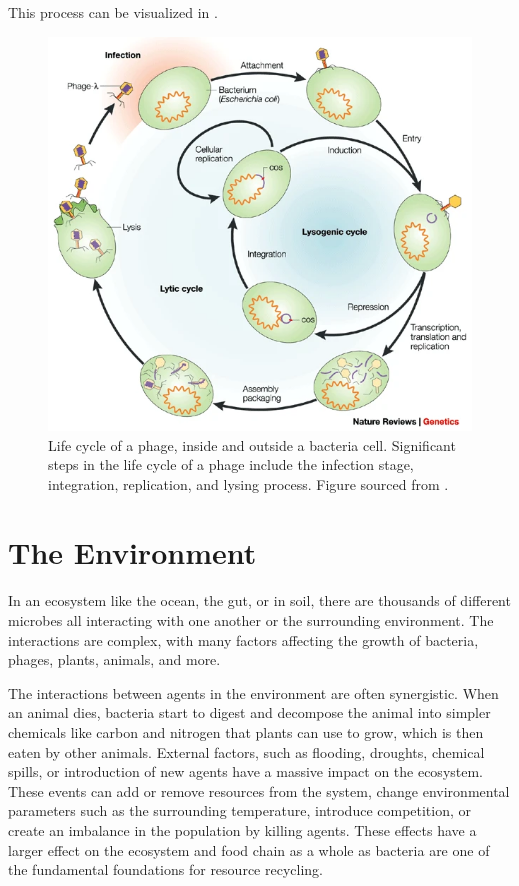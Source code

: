 This process can be visualized in .
\begin{figure}
    \centering
    \includegraphics[width=0.5\linewidth]{Figures/phage_life_cycle.png}
    \caption{Life cycle of a phage, inside and outside a bacteria cell. Significant steps in the life cycle of a phage include the infection stage, integration, replication, and lysing process. Figure sourced from \citet{campbellFutureBacteriophageBiology2003}. }
    \label{fig:phage_life_cycle}
\end{figure}

\section{The Environment}
In an ecosystem like the ocean, the gut, or in soil, there are thousands of different microbes all interacting with one another or the surrounding environment.
The interactions are complex, with many factors affecting the growth of bacteria, phages, plants, animals, and more. 

The interactions between agents in the environment are often synergistic. 
When an animal dies, bacteria start to digest and decompose the animal into simpler chemicals like carbon and nitrogen that plants can use to grow, which is then eaten by other animals. 
External factors, such as flooding, droughts, chemical spills, or introduction of new agents have a massive impact on the ecosystem. 
These events can add or remove resources from the system, change environmental parameters such as the surrounding temperature, introduce competition, or create an imbalance in the population by killing agents. 
These effects have a larger effect on the ecosystem and food chain as a whole as bacteria are one of the fundamental foundations for resource recycling. 

